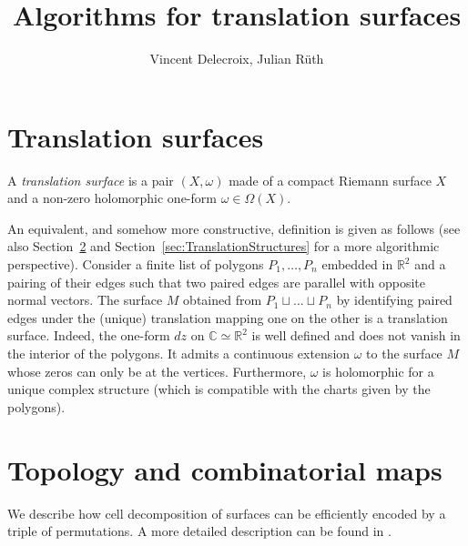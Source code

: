 \documentclass[a4paper,12pt]{article}
\title{Algorithms for translation surfaces}
\author{Vincent Delecroix, Julian R\"uth}
\def\bC{\mathbb{C}}
\def\bR{\mathbb{R}}
\begin{document}
\maketitle

\tableofcontents

\newpage
\section{Translation surfaces}
\label{sec:TranslationSurfaces}

A \emph{translation surface} is a pair $(X, \omega)$ made of a compact Riemann surface
$X$ and a non-zero holomorphic one-form $\omega \in \Omega(X)$.

An equivalent, and somehow more constructive, definition is given as
follows (see also Section~\ref{sec:TopologyAndCombinatorialMaps} and
Section~\ref{sec:TranslationStructures} for a more algorithmic perspective).
Consider a finite list of polygons $P_1, \ldots, P_n$ embedded in $\bR^2$ and a
pairing of their edges such that two paired edges are parallel with opposite
normal vectors. The surface $M$ obtained from $P_1 \sqcup \ldots \sqcup P_n$ by
identifying paired edges under the (unique) translation mapping one on the
other is a translation surface. Indeed, the one-form $dz$ on $\bC \simeq \bR^2$
is well defined and does not vanish in the interior of the polygons. It admits
a continuous extension $\omega$ to the surface $M$ whose zeros can only be at
the vertices. Furthermore, $\omega$ is holomorphic for a unique complex
structure (which is compatible with the charts given by the polygons).


\section{Topology and combinatorial maps}
\label{sec:TopologyAndCombinatorialMaps}
We describe how cell decomposition of surfaces can be efficiently encoded by
a triple of permutations. A more detailed description can be found in
\cite[Section 1.3.1 "Graphs versus Maps"]{LandoZvonkin}.
\end{document}
